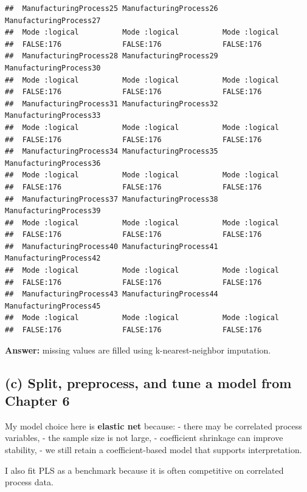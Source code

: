 \documentclass[
  11pt,
]{article}
\begin{document}
\begin{verbatim}
##  ManufacturingProcess25 ManufacturingProcess26 ManufacturingProcess27
##  Mode :logical          Mode :logical          Mode :logical         
##  FALSE:176              FALSE:176              FALSE:176             
##  ManufacturingProcess28 ManufacturingProcess29 ManufacturingProcess30
##  Mode :logical          Mode :logical          Mode :logical         
##  FALSE:176              FALSE:176              FALSE:176             
##  ManufacturingProcess31 ManufacturingProcess32 ManufacturingProcess33
##  Mode :logical          Mode :logical          Mode :logical         
##  FALSE:176              FALSE:176              FALSE:176             
##  ManufacturingProcess34 ManufacturingProcess35 ManufacturingProcess36
##  Mode :logical          Mode :logical          Mode :logical         
##  FALSE:176              FALSE:176              FALSE:176             
##  ManufacturingProcess37 ManufacturingProcess38 ManufacturingProcess39
##  Mode :logical          Mode :logical          Mode :logical         
##  FALSE:176              FALSE:176              FALSE:176             
##  ManufacturingProcess40 ManufacturingProcess41 ManufacturingProcess42
##  Mode :logical          Mode :logical          Mode :logical         
##  FALSE:176              FALSE:176              FALSE:176             
##  ManufacturingProcess43 ManufacturingProcess44 ManufacturingProcess45
##  Mode :logical          Mode :logical          Mode :logical         
##  FALSE:176              FALSE:176              FALSE:176
\end{verbatim}

\textbf{Answer:} missing values are filled using k-nearest-neighbor
imputation.

\subsection{(c) Split, preprocess, and tune a model from Chapter
6}\label{c-split-preprocess-and-tune-a-model-from-chapter-6}

My model choice here is \textbf{elastic net} because: - there may be
correlated process variables, - the sample size is not large, -
coefficient shrinkage can improve stability, - we still retain a
coefficient-based model that supports interpretation.

I also fit PLS as a benchmark because it is often competitive on
correlated process data.
\end{document}
